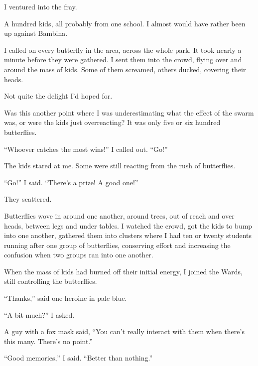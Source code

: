 I ventured into the fray.



A hundred kids, all probably from one school.  I almost would have rather been up against Bambina.



I called on every butterfly in the area, across the whole park.  It took nearly a minute before they were gathered.  I sent them into the crowd, flying over and around the mass of kids.  Some of them screamed, others ducked, covering their heads.



Not quite the delight I'd hoped for.



Was this another point where I was underestimating what the effect of the swarm was, or were the kids just overreacting?  It was only five or six hundred butterflies.



``Whoever catches the most wins!'' I called out.  ``Go!''



The kids stared at me.  Some were still reacting from the rush of butterflies.



``Go!'' I said.  ``There's a prize!  A good one!''



They scattered.



Butterflies wove in around one another, around trees, out of reach and over heads, between legs and under tables.  I watched the crowd, got the kids to bump into one another, gathered them into clusters where I had ten or twenty students running after one group of butterflies, conserving effort and increasing the confusion when two groups ran into one another.



When the mass of kids had burned off their initial energy, I joined the Wards, still controlling the butterflies.



``Thanks,'' said one heroine in pale blue.



``A bit much?''  I asked.



A guy with a fox mask said, ``You can't really interact with them when there's this many.  There's no point.''



``Good memories,'' I said.  ``Better than nothing.''



